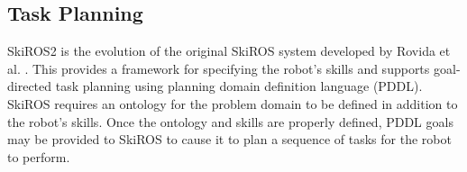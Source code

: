 
\subsection{Task Planning} \label{sec:task_planning}
SkiROS2 is the evolution of the original SkiROS system developed by Rovida et al. \cite{rovida2017skiros}. This provides a framework for specifying the robot's skills and supports goal-directed task planning using planning domain definition language (PDDL). SkiROS requires an ontology for the problem domain to be defined in addition to the robot's skills. Once the ontology and skills are properly defined, PDDL goals may be provided to SkiROS to cause it to plan a sequence of tasks for the robot to perform.



